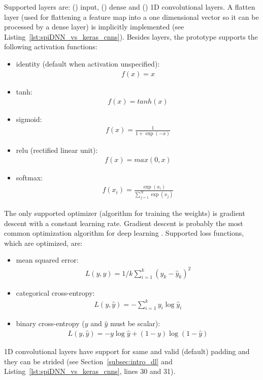 \documentclass[]{article}
\begin{document}
Supported layers are: () input,
() dense and () 1D convolutional layers.
A flatten layer (used for flattening a feature map into a one
dimensional vector so it can be processed by a dense layer) is
implicitly implemented (see Listing~\ref{lst:spiDNN_vs_keras_cnns}).
Besides layers, the prototype supports the following activation
functions:
\begin{itemize}
  \item identity (default when activation unspecified):
    \begin{align}
      f(x) = x
    \end{align}
  \item tanh:
    \begin{align}
      f(x) = tanh(x)
    \end{align}
  \item sigmoid:
    \begin{align}
      f(x) = \frac{1}{1 + \exp(-x)}
    \end{align}
  \item relu (rectified linear unit):
    \begin{align}
      f(x) = max(0, x)
    \end{align}
  \item softmax:
    \begin{align}
      \label{eq:softmax}
      f(x_i) = \frac{\exp(x_i)}{\sum_{j=1}^{N}\exp(x_j)}
    \end{align}
\end{itemize}
The only supported optimizer (algorithm for training the weights) is
gradient descent with a constant learning rate.
Gradient descent is probably the most common optimization algorithm
for deep learning \citep{goodfellow_et_al_2016}.
Supported loss functions, which are optimized, are:
\begin{itemize}
  \item mean squared error:
    \begin{align}
      \label{eq:mse}
      L(y, \hat{y}) = 1/k \sum_{i=1}^k(y_k - \hat{y}_k)^2
    \end{align}

  \item categorical cross-entropy:
    \begin{align}
      L(y, \hat{y}) = - \sum_{i=1}^{k} y_i \log \hat{y}_i
    \end{align}

  \item binary cross-entropy ($y$ and $\hat{y}$ must be scalar):
    \begin{align}
      L(y, \hat{y}) = - y \log \hat{y} + (1 - y) \log(1 - \hat{y})
    \end{align}
\end{itemize}
1D convolutional layers have support for same and valid (default)
padding and they can be strided (see Section~\ref{subsec:intro_dl}
and Listing~\ref{lst:spiDNN_vs_keras_cnns}, lines 30 and 31).
\end{document}
